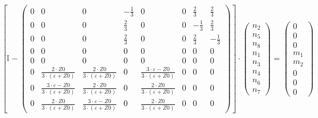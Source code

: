 \[ \left[ \mathbb{I}  - \left(\begin{array}{cccccccc} 0 & 0 & 0 &
-\frac{1}{3} & 0 & 0 & \frac{2}{3} & \frac{2}{3} \\ 0 & 0 & 0 &
\frac{2}{3} & 0 & 0 & -\frac{1}{3} & \frac{2}{3} \\ 0 & 0 & 0 &
\frac{2}{3} & 0 & 0 & \frac{2}{3} & -\frac{1}{3} \\ 0 & 0 & 0 & 0 & 0
& 0 & 0 & 0 \\ 0 & 0 & 0 & 0 & 0 & 0 & 0 & 0 \\ 0 & \frac{2\cdot
Z0}{3\cdot \left(\varepsilon+Z0\right)} & \frac{2\cdot Z0}{3\cdot
\left(\varepsilon+Z0\right)} & 0 & \frac{3\cdot \varepsilon-Z0}{3\cdot
\left(\varepsilon+Z0\right)} & 0 & 0 & 0 \\ 0 & \frac{3\cdot
\varepsilon-Z0}{3\cdot \left(\varepsilon+Z0\right)} & \frac{2\cdot
Z0}{3\cdot \left(\varepsilon+Z0\right)} & 0 & \frac{2\cdot Z0}{3\cdot
\left(\varepsilon+Z0\right)} & 0 & 0 & 0 \\ 0 & \frac{2\cdot
Z0}{3\cdot \left(\varepsilon+Z0\right)} & \frac{3\cdot
\varepsilon-Z0}{3\cdot \left(\varepsilon+Z0\right)} & 0 & \frac{2\cdot
Z0}{3\cdot \left(\varepsilon+Z0\right)} & 0 & 0 & 0
\end{array}\right)\right] \cdot \left(\begin{array}{c} n_{2} \\ n_{5}
\\ n_{8} \\ n_{1} \\ n_{3} \\ n_{4} \\ n_{6} \\ n_{7}
\end{array}\right) = \left(\begin{array}{c} 0 \\ 0 \\ 0 \\ m_{1} \\
m_{2} \\ 0 \\ 0 \\ 0 \end{array}\right) \]
